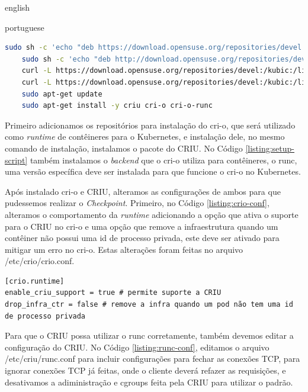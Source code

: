 \begin{otherlanguage*}{english}
\begin{otherlanguage*}{portuguese}
\begin{lstlisting}[language=bash,caption={Comandos de configuração da máquina para CRIU e cri-o.},label={listing:setup-script}]
   sudo sh -c 'echo "deb https://download.opensuse.org/repositories/devel:/kubic:/libcontainers:/stable/xUbuntu_20.04/ /" > /etc/apt/sources.list.d/devel:kubic:libcontainers:stable.list'
	sudo sh -c 'echo "deb http://download.opensuse.org/repositories/devel:/kubic:/libcontainers:/stable:/cri-o:/1.25/xUbuntu_20.04/ /" > /etc/apt/sources.list.d/devel:kubic:libcontainers:stable:cri-o:$CRIO_VERSION.list'
	curl -L https://download.opensuse.org/repositories/devel:/kubic:/libcontainers:/stable:/cri-o:/1.25/xUbuntu_20.04/Release.key | sudo apt-key add -
	curl -L https://download.opensuse.org/repositories/devel:/kubic:/libcontainers:/stable/xUbuntu_20.04/Release.key | sudo apt-key add -
	sudo apt-get update
	sudo apt-get install -y criu cri-o cri-o-runc
\end{lstlisting}

Primeiro adicionamos os repositórios para instalação do cri-o, que será utilizado como
\textit{runtime} de contêineres para o Kubernetes, e instalação dele, no mesmo comando
de instalação, instalamos o pacote do CRIU. No Código \ref{listing:setup-script} também
instalamos o \textit{backend} que o cri-o utiliza para contêineres, o runc, uma versão
específica deve ser instalada para que funcione o cri-o no Kubernetes.

Após instalado cri-o e CRIU, alteramos as configurações de ambos para que pudessemos
realizar o \textit{Checkpoint}. Primeiro, no Código \ref{listing:crio-conf}, alteramos
o comportamento da \textit{runtime} adicionando a opção que ativa o suporte para o CRIU
no cri-o e uma opção que remove a infraestrutura quando um contêiner não possui uma id de
processo privada, este deve ser ativado para mitigar um erro no cri-o. Estas alterações
foram feitas no arquivo /etc/crio/crio.conf.

\begin{lstlisting}[language=plaintext,caption={Configuração a ser incluída no arquivo de configurações do cri-o.},label={listing:crio-conf}]
[crio.runtime]
enable_criu_support = true # permite suporte a CRIU
drop_infra_ctr = false # remove a infra quando um pod não tem uma id de processo privada
\end{lstlisting}

Para que o CRIU possa utilizar o runc corretamente, também devemos editar a configuração
do CRIU. No Código \ref{listing:runc-conf}, editamos o arquivo /etc/criu/runc.conf para 
incluir configurações para fechar as conexões TCP, para ignorar conexões TCP já feitas,
onde o cliente deverá refazer as requisições, e desativamos a adiministração e cgroups
feita pela CRIU para utilizar o padrão.


\end{otherlanguage*}
\end{otherlanguage*}
